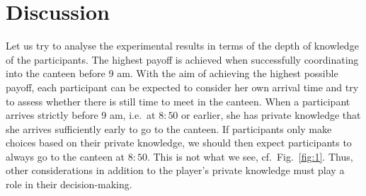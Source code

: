 \documentclass[twocolumn,a4paper,superscriptaddress,nofootinbib]{revtex4}
\begin{document}
\section{Discussion}\label{discussion}
Let us try to analyse the experimental results in terms of the depth of knowledge of the participants. The highest payoff is achieved when successfully coordinating into the canteen before 9 am. With the aim of achieving the highest possible payoff, each participant can be expected to consider her own arrival time and try to assess whether there is still time to meet in the canteen. When a participant arrives strictly before 9 am, i.e.\ at $8{:}50$ or earlier, she has private knowledge that she arrives sufficiently early to go to the canteen. If participants only make choices based on their private knowledge, we should then expect participants to always go to the canteen at $8{:}50$. This is not what we see, cf.\ Fig.~\ref{fig:1}. Thus, other considerations in addition to the player's private knowledge must play a role in their decision-making.
\end{document}
